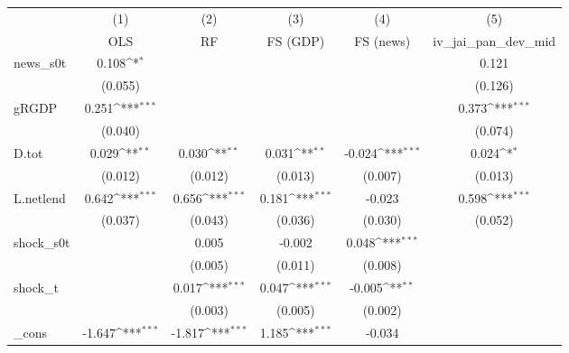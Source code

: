 {
\def\sym#1{\ifmmode^{#1}\else\(^{#1}\)\fi}
\begin{tabular}{l*{5}{c}}
\toprule
            &\multicolumn{1}{c}{(1)}&\multicolumn{1}{c}{(2)}&\multicolumn{1}{c}{(3)}&\multicolumn{1}{c}{(4)}&\multicolumn{1}{c}{(5)}\\
            &\multicolumn{1}{c}{OLS}&\multicolumn{1}{c}{RF}&\multicolumn{1}{c}{FS (GDP)}&\multicolumn{1}{c}{FS (news)}&\multicolumn{1}{c}{iv\_jai\_pan\_dev\_mid}\\
\midrule
news\_s0t    &       0.108\sym{*}  &                     &                     &                     &       0.121         \\
            &     (0.055)         &                     &                     &                     &     (0.126)         \\
\addlinespace
gRGDP       &       0.251\sym{***}&                     &                     &                     &       0.373\sym{***}\\
            &     (0.040)         &                     &                     &                     &     (0.074)         \\
\addlinespace
D.tot       &       0.029\sym{**} &       0.030\sym{**} &       0.031\sym{**} &      -0.024\sym{***}&       0.024\sym{*}  \\
            &     (0.012)         &     (0.012)         &     (0.013)         &     (0.007)         &     (0.013)         \\
\addlinespace
L.netlend   &       0.642\sym{***}&       0.656\sym{***}&       0.181\sym{***}&      -0.023         &       0.598\sym{***}\\
            &     (0.037)         &     (0.043)         &     (0.036)         &     (0.030)         &     (0.052)         \\
\addlinespace
shock\_s0t   &                     &       0.005         &      -0.002         &       0.048\sym{***}&                     \\
            &                     &     (0.005)         &     (0.011)         &     (0.008)         &                     \\
\addlinespace
shock\_t     &                     &       0.017\sym{***}&       0.047\sym{***}&      -0.005\sym{**} &                     \\
            &                     &     (0.003)         &     (0.005)         &     (0.002)         &                     \\
\addlinespace
\_cons      &      -1.647\sym{***}&      -1.817\sym{***}&       1.185\sym{***}&      -0.034         &                     \\

\end{tabular}}
